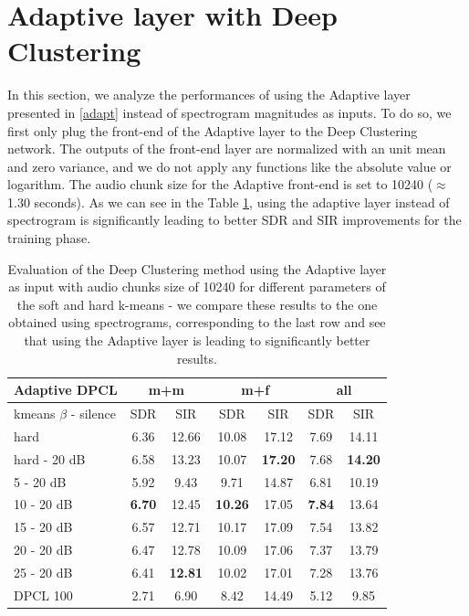 \documentclass[master, tikz, final,11pt, dvipdfmx]{iscs-thesis}
\begin{document}
\section{Adaptive layer with Deep Clustering}
\label{DPCLADAPT}

In this section, we analyze the performances of using the Adaptive layer presented in \autoref{adapt} instead of spectrogram magnitudes as inputs.
To do so, we first only plug the front-end of the Adaptive layer to the Deep Clustering network. The outputs of the front-end layer are normalized with an unit mean and zero variance, 
and we do not apply any functions like the absolute value or logarithm.
The audio chunk size for the Adaptive front-end is set to 10240 ($\approx$ 1.30 seconds). 
As we can see in the Table \ref{table:AdaptDPCL100}, using the adaptive layer instead of spectrogram is significantly leading to better SDR and SIR improvements for the training phase.


\begin{table}[h!]
\centering
\begin{tabular}{l|c|c|c|c|c|c}
Adaptive DPCL & \multicolumn{2}{c|}{m+m} & \multicolumn{2}{c|}{m+f} & \multicolumn{2}{c}{all} \\ 
\hline 
kmeans $\beta$ - silence & SDR & SIR & SDR & SIR & SDR & SIR \\ 
\hline 
hard & 6.36 & 12.66 & 10.08 & 17.12 & 7.69 & 14.11 \\ 
hard - 20 dB & 6.58 & 13.23 & 10.07 & \textbf{17.20} & 7.68 & \textbf{14.20} \\ 
\hline 
\hline 
5 - 20 dB & 5.92 & 9.43 & 9.71 & 14.87 & 6.81 & 10.19 \\ 
10 - 20 dB & \textbf{6.70} & 12.45 & \textbf{10.26} & 17.05 & \textbf{7.84} & 13.64 \\ 
15 - 20 dB & 6.57 & 12.71 & 10.17 & 17.09 & 7.54 & 13.82 \\ 
20 - 20 dB & 6.47 & 12.78 & 10.09 & 17.06 & 7.37 & 13.79 \\ 
25 - 20 dB & 6.41 & \textbf{12.81} & 10.02 & 17.01 & 7.28 & 13.76 \\ 
\hline 
\hline 
DPCL 100 & 2.71 & 6.90 & 8.42 & 14.49 & 5.12 & 9.85 \\ 
\end{tabular}
\caption[Evaluation of the Deep Clustering approach using the Adaptive layer with audio chunks size of 10240 frames]{Evaluation of the Deep Clustering method using the Adaptive layer as input with audio chunks size of 10240 for different parameters of the soft and hard k-means - we compare these results to the one obtained using spectrograms, corresponding to the last row and see that using the Adaptive layer is leading to significantly better results.}
\label{table:AdaptDPCL100}
\end{table}
\end{document}
